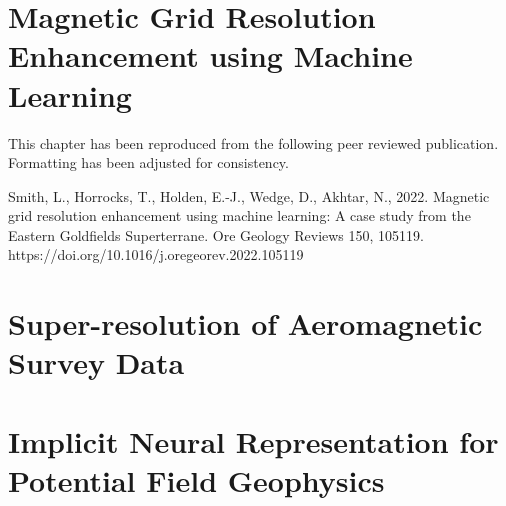 \documentclass[12pt,a4paper,notitlepage]{report} %
\begin{document}
\chapter{Magnetic Grid Resolution Enhancement using Machine Learning}
\label{ch:paper1}
This chapter has been reproduced from the following peer reviewed publication. Formatting has been adjusted for consistency.

Smith, L., Horrocks, T., Holden, E.-J., Wedge, D., Akhtar, N., 2022. Magnetic grid resolution enhancement using machine learning: A case study from the Eastern Goldfields Superterrane. Ore Geology Reviews 150, 105119.
https://doi.org/10.1016/j.oregeorev.2022.105119
% 
% 

\newrefsection{}

\chapter{Super-resolution of Aeromagnetic Survey Data}
\label{ch:paper2}

\newrefsection{}

\chapter{Implicit Neural Representation for Potential Field Geophysics}
\label{ch:paper3}

\newrefsection{}

% 
% 

\end{document}
